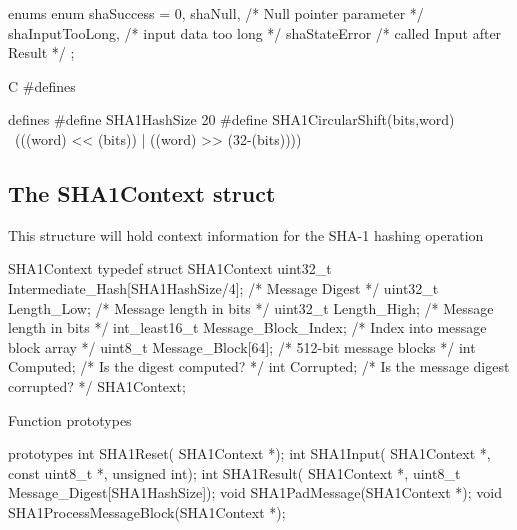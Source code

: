 \begin{chunk}{enums}
enum
{
    shaSuccess = 0,
    shaNull,            /* Null pointer parameter */
    shaInputTooLong,    /* input data too long */
    shaStateError       /* called Input after Result */
};

\end{chunk}

\vspace{1mm}
\noindent
C \#defines
\begin{chunk}{defines}
#define SHA1HashSize 20
#define SHA1CircularShift(bits,word) \
                (((word) << (bits)) | ((word) >> (32-(bits))))


\end{chunk}

\subsection{The SHA1Context struct}
\noindent
This structure will hold context information for the SHA-1 hashing operation
\begin{chunk}{SHA1Context}
typedef struct SHA1Context
{
 uint32_t Intermediate_Hash[SHA1HashSize/4]; /* Message Digest          */
 uint32_t Length_Low;               /* Message length in bits           */
 uint32_t Length_High;              /* Message length in bits           */
 int_least16_t Message_Block_Index; /* Index into message block array   */
 uint8_t Message_Block[64];         /* 512-bit message blocks           */
 int Computed;                      /* Is the digest computed?          */
 int Corrupted;                     /* Is the message digest corrupted? */
} SHA1Context;

\end{chunk}

\noindent
Function prototypes
\begin{chunk}{prototypes}
int SHA1Reset(  SHA1Context *);
int SHA1Input(  SHA1Context *, const uint8_t *, unsigned int);
int SHA1Result( SHA1Context *, uint8_t Message_Digest[SHA1HashSize]);
void SHA1PadMessage(SHA1Context *);
void SHA1ProcessMessageBlock(SHA1Context *);

\end{chunk}


